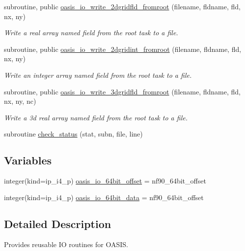 \begin{DoxyCompactItemize}
subroutine, public \hyperlink{namespacemod__oasis__io_a18912324646473cf8fedd7138cc59a79}{oasis\+\_\+io\+\_\+write\+\_\+2dgridfld\+\_\+fromroot} (filename, fldname, fld, nx, ny)
\begin{DoxyCompactList}\small\item\em Write a real array named field from the root task to a file. \end{DoxyCompactList}\item 
subroutine, public \hyperlink{namespacemod__oasis__io_a432ecb26e0e2d8387c1601ea6cc68668}{oasis\+\_\+io\+\_\+write\+\_\+2dgridint\+\_\+fromroot} (filename, fldname, fld, nx, ny)
\begin{DoxyCompactList}\small\item\em Write an integer array named field from the root task to a file. \end{DoxyCompactList}\item 
subroutine, public \hyperlink{namespacemod__oasis__io_aa967e930e5d6199bbc6ec9a4f3c7069e}{oasis\+\_\+io\+\_\+write\+\_\+3dgridfld\+\_\+fromroot} (filename, fldname, fld, nx, ny, nc)
\begin{DoxyCompactList}\small\item\em Write a 3d real array named field from the root task to a file. \end{DoxyCompactList}\item 
subroutine \hyperlink{namespacemod__oasis__io_ab82165daa65fd85a13d8fe5ec9e2293e}{check\+\_\+status} (stat, subn, file, line)
\end{DoxyCompactItemize}
\subsection*{Variables}
\begin{DoxyCompactItemize}
\item 
integer(kind=ip\+\_\+i4\+\_\+p) \hyperlink{namespacemod__oasis__io_afb3f1a32c9458479f33439c5c3a94115}{oasis\+\_\+io\+\_\+64bit\+\_\+offset} = nf90\+\_\+64bit\+\_\+offset
\item 
integer(kind=ip\+\_\+i4\+\_\+p) \hyperlink{namespacemod__oasis__io_a18f97049c0295ca8d358d996c69a805e}{oasis\+\_\+io\+\_\+64bit\+\_\+data} = nf90\+\_\+64bit\+\_\+offset
\end{DoxyCompactItemize}


\subsection{Detailed Description}
Provides reusable IO routines for O\+A\+S\+IS. 

